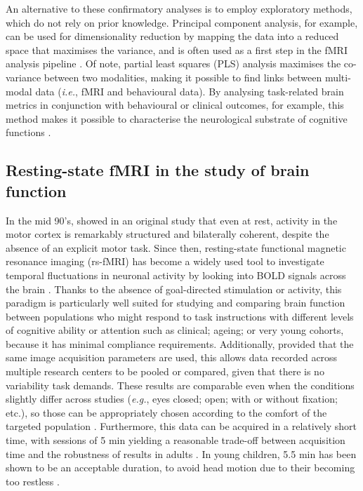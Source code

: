 An alternative to these confirmatory analyses is to employ exploratory methods, which do not rely on prior knowledge. Principal component analysis, for example, can be used for dimensionality reduction by mapping the data into a reduced space that maximises the variance, and is often used as a first step in the fMRI analysis pipeline \citep{Zhong2009}. Of note, partial least squares (PLS) analysis \citep{Randal2004} maximises the co-variance between two modalities, making it possible to find links between multi-modal data (\textit{i.e.}, fMRI and behavioural data). By analysing task-related brain metrics in conjunction with behavioural or clinical outcomes, for example, this method makes it possible to characterise the neurological substrate of cognitive functions \citep{Roberts2017}.





\subsection{Resting-state fMRI in the study of brain function} \label{subsec:ch2_restingState}

In the mid 90's, \citep{Biswal1995} showed in an original study that even at rest, activity in the motor cortex is remarkably structured and bilaterally coherent, despite the absence of an explicit motor task. Since then, resting-state functional magnetic resonance imaging (rs-fMRI) has become a widely used tool to investigate temporal fluctuations in neuronal activity by looking into  BOLD signals across the brain \citep{Damoiseaux2006, Fox2007}. Thanks to the absence of goal-directed stimulation or activity, this paradigm is particularly well suited for studying and comparing brain function between populations who might respond to task instructions with different levels of cognitive ability or attention such as clinical; ageing; or very young cohorts, because it has minimal compliance requirements. Additionally, provided that the same image acquisition parameters are used, this allows data recorded across multiple research centers to be pooled or compared, given that there is no variability task demands. These results are comparable even when the conditions slightly differ across studies (\textit{e.g.}, eyes closed; open; with or without fixation; etc.), so those can be appropriately chosen according to the comfort of the targeted population \citep{Soares2016}. Furthermore, this data can be acquired in a relatively short time, with sessions of 5 min yielding a reasonable trade-off between acquisition time and the robustness of results in adults \citep{VanDijk2010, Whitlow2011}. In young children, 5.5 min has been shown to be an acceptable duration, to avoid head motion due to their becoming too restless \citep{White2014a}. 

